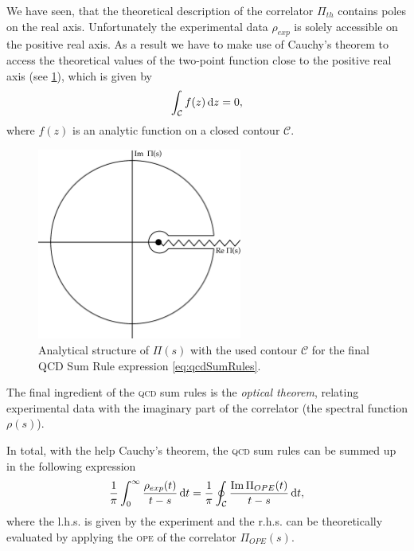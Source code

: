 \documentclass[../../index.tex]{subfiles}
\begin{document}
We have seen, that the theoretical description of the correlator $\Pi_{th}$
contains poles on the real axis. Unfortunately the experimental data
$\rho_{exp}$ is solely accessible on the positive real axis. As a result we have
to make use of Cauchy's theorem to access the theoretical values of the
two-point function close to the positive real axis (see
\cref{fig:correlatorComplexContour}), which is given by
\begin{equation}
  \label{eq:cauchysTheorem}
  \int_{\mathcal{C}} f(z) \dif z = 0,
\end{equation}
where $f(z)$ is an analytic function on a closed contour $\mathcal{C}$.
\begin{figure}[h]
  \centering
  \label{fig:correlatorComplexContour}
  \includegraphics[width=0.6\textwidth]{./images/correlatorComplexContour.eps}
  \caption{Analytical structure of $\Pi(s)$ with the used contour $\mathcal{C}$
    for the final QCD Sum Rule expression \cref{eq:qcdSumRules}.}
\end{figure}

The final ingredient of the \textsc{qcd} sum rules is the \textit{optical
  theorem}, relating experimental data with the imaginary part of the correlator
(the spectral function $\rho(s)$).

In total, with the help Cauchy's theorem, the \textsc{qcd} sum rules can be
summed up in the following expression
\begin{equation}
  \label{eq:qcdSumRules}
  \frac{1}{\pi}\int_0^\infty \frac{\rho_{exp}(t)}{t - s}\dif t = \frac{1}{\pi} \oint_{\mathcal{C}} \frac{\Ima \Pi_{OPE}(t)}{t -s}\dif t,
\end{equation}
where the l.h.s. is given by the experiment and the r.h.s. can be theoretically
evaluated by applying the \textsc{ope} of the correlator $\Pi_{OPE}(s)$.
\end{document}
